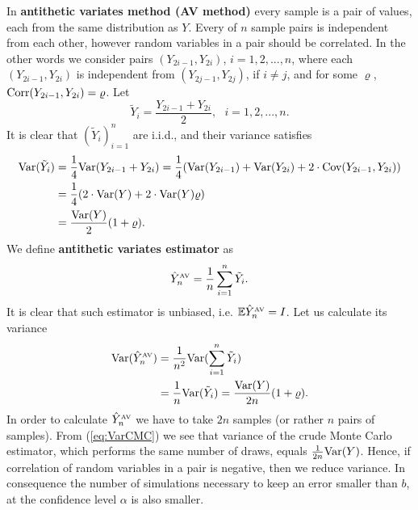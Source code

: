 \documentclass[a4paper,11pt, twoside]{book}
\theoremstyle{definition}
\theoremstyle{remark}
\def\Var{{\rm Var}}
\def\E{{\mathbb{E}}}
\def\Cov{{\hbox{Cov}}}
\def\Corr{{\hbox{Corr}}}
\def\AV[#1]{\hat{Y}^{\hbox{\tiny AV}}_{#1}}
\begin{document}
In \textbf{antithetic variates method (AV method)} every sample is a pair of values, each from the same distribution as $Y$. Every of $n$ sample pairs is independent from each other, however random variables in a pair should be correlated. In the other words we consider pairs $(Y_{2i-1}, Y_{2i})$, $i=1,2,...,n$,
where each $(Y_{2i-1}, Y_{2i})$ is independent from $(Y_{2j-1}, Y_{2j})$, if $i \neq j$, and for some $\varrho$, $\Corr(Y_{2i-1}, Y_{2i}) = \varrho$. Let
\begin{equation*}
 \tilde{Y}_i = \frac{Y_{2i-1} + Y_{2i}}{2},\ \ \ i = 1,2,...,n.
\end{equation*}
It is clear that $(\tilde{Y}_i)_{i=1}^n$ are i.i.d., and their variance satisfies
\begin{equation*}
 \begin{split}
 \Var(\tilde{Y}_i) &= \dfrac{1}{4} \Var( Y_{2i-1} + Y_{2i} ) = \dfrac{1}{4} (\Var(Y_{2i-1}) + \Var(Y_{2i}) + 2\cdot\Cov(Y_{2i-1}, Y_{2i})) \\
 &= \dfrac{1}{4} (2\cdot\Var(Y) + 2\cdot\Var(Y)\varrho) \\
 &= \dfrac{\Var(Y)}{2} (1 + \varrho).
 \end{split}
\end{equation*}
We define \textbf{antithetic variates estimator} as
\begin{equation*}
 \AV[n] = \frac{1}{n}\sum\limits_{i=1}^n \tilde{Y}_i.
\end{equation*}
It is clear that such estimator is unbiased, i.e. $\E\AV[n] = I$. Let us calculate its variance
\begin{equation}
 \label{eq:VarAV}
 \begin{split}
 \Var(\AV[n]) &= \frac{1}{n^2} \Var(\sum\limits_{i=1}^n \tilde{Y}_i) \\
   &= \frac{1}{n} \Var(\tilde{Y}_i) = \dfrac{\Var(Y)}{2n} (1 + \varrho).
 \end{split}
\end{equation}
In order to calculate $\AV[n]$ we have to take $2n$ samples (or rather $n$ pairs of samples). From (\ref{eq:VarCMC}) we see that variance of the crude Monte Carlo estimator, which performs the same number of draws, equals $\frac{1}{2n}\Var(Y)$. Hence, if correlation of random variables in a pair is negative, then we reduce variance. In consequence the number of simulations necessary to keep an error smaller than $b$, at the confidence level $\alpha$ is also smaller.
\end{document}
